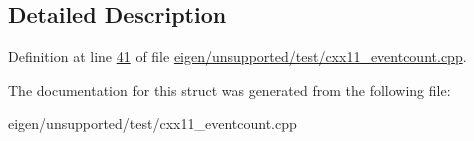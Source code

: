 \subsection{Detailed Description}


Definition at line \hyperlink{eigen_2unsupported_2test_2cxx11__eventcount_8cpp_source_l00041}{41} of file \hyperlink{eigen_2unsupported_2test_2cxx11__eventcount_8cpp_source}{eigen/unsupported/test/cxx11\+\_\+eventcount.\+cpp}.



The documentation for this struct was generated from the following file\+:\begin{DoxyCompactItemize}
\item 
eigen/unsupported/test/cxx11\+\_\+eventcount.\+cpp\end{DoxyCompactItemize}
